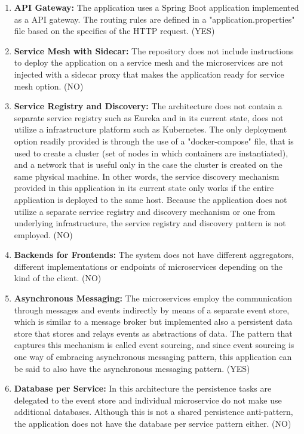 \documentclass{Configuration_Files/PoliMi3i_thesis}
\begin{document}
\begin{enumerate}
    \item \textbf{API Gateway:} The application uses a Spring Boot application implemented as a API gateway.
    The routing rules are defined in a "application.properties" file based on the specifics of the HTTP request. (YES)
    
    \item \textbf{Service Mesh with Sidecar:} The repository does not include instructions to deploy the application on a service mesh and the microservices are not injected with a sidecar proxy that makes the application ready for service mesh option. (NO)
    
    \item \textbf{Service Registry and Discovery:} The architecture does not contain a separate service registry such as Eureka and in its current state, does not utilize a infrastructure platform such as Kubernetes.
    The only deployment option readily provided is through the use of a "docker-compose" file, that is used to create a cluster (set of nodes in which containers are instantiated), and a network that is useful only in the case the cluster is created on the same physical machine.
    In other words, the service discovery mechanism provided in this application in its current state only works if the entire application is deployed to the same host.
    Because the application does not utilize a separate service registry and discovery mechanism or one from underlying infrastructure, the service registry and discovery pattern is not employed. (NO)
    
    \item \textbf{Backends for Frontends:} The system does not have different aggregators, different implementations or endpoints of microservices depending on the kind of the client. (NO)
    
    \item \textbf{Asynchronous Messaging:} The microservices employ the communication through messages and events indirectly by means of a separate event store, which is similar to a message broker but implemented also a persistent data store that stores and relays events as abstractions of data.
    The pattern that captures this mechanism is called event sourcing, and since event sourcing is one way of embracing asynchronous messaging pattern, this application can be said to also have the asynchronous messaging pattern. (YES)
    
    \item \textbf{Database per Service:} In this architecture the persistence tasks are delegated to the event store and individual microservice do not make use additional databases.
    Although this is not a shared persistence anti-pattern, the application does not have the database per service pattern either. (NO)
    

\end{enumerate}
\end{document}
